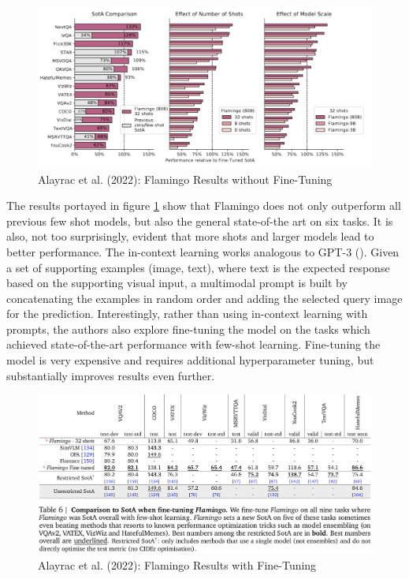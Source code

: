 \documentclass[
]{krantz}
\begin{document}
\begin{figure}

{\centering \includegraphics[width=1\linewidth]{figures/05-chapter2/flamingoresult} 

}

\caption{Alayrac et al. (2022): Flamingo Results without Fine-Tuning}\label{fig:flamingoresult}
\end{figure}

The results portayed in figure \ref{fig:flamingoresult} show that Flamingo does not only outperform all previous few shot models, but also the general state-of-the art on six tasks. It is also, not too surprisingly, evident that more shots and larger models lead to better performance.
The in-context learning works analogous to GPT-3 (\citet{brown2020language}). Given a set of supporting examples (image, text), where text is the expected response based on the supporting visual input, a multimodal prompt is built by concatenating the examples in random order and adding the selected query image for the prediction.
Interestingly, rather than using in-context learning with prompts, the authors also explore fine-tuning the model on the tasks which achieved state-of-the-art performance with few-shot learning. Fine-tuning the model is very expensive and requires additional hyperparameter tuning, but substantially improves results even further.

\begin{figure}

{\centering \includegraphics[width=1\linewidth]{figures/05-chapter2/flamingofinetune} 

}

\caption{Alayrac et al. (2022): Flamingo Results with Fine-Tuning}\label{fig:flamingfinetune}
\end{figure}
\end{document}

